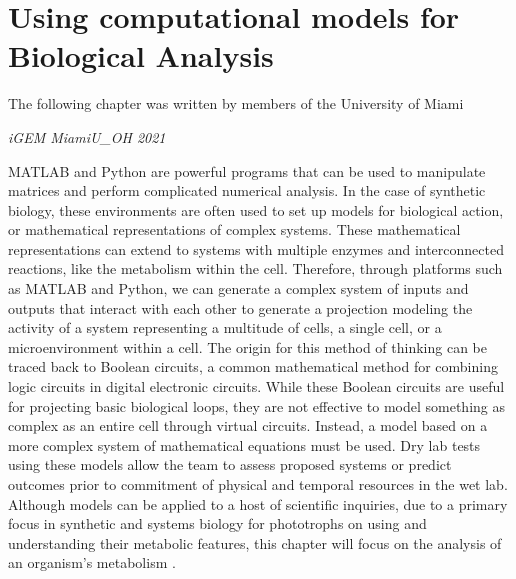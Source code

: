 \section{Using computational models for Biological Analysis}
\epigraph{The following chapter was written by members of the University of Miami }{\textit{iGEM MiamiU\_OH 2021}}
\noindent
MATLAB and Python are powerful programs that can be used to manipulate matrices and perform complicated numerical analysis. In the case of synthetic biology, these environments are often used to set up models for biological action, or mathematical representations of complex systems. These mathematical representations can extend to systems with multiple enzymes and interconnected reactions, like the metabolism within the cell. Therefore, through platforms such as MATLAB and Python, we can generate a complex system of inputs and outputs that interact with each other to generate a projection modeling the activity of a system representing a multitude of cells, a single cell, or a microenvironment within a cell. The origin for this method of thinking can be traced back to Boolean circuits, a common mathematical method for combining logic circuits in digital electronic circuits. While these Boolean circuits are useful for projecting basic biological loops, they are not effective to model something as complex as an entire cell through virtual circuits. Instead, a model based on a more complex system of mathematical equations must be used. Dry lab tests using these models allow the team to assess proposed systems or predict outcomes prior to commitment of physical and temporal resources in the wet lab.\\
Although models can be applied to a host of scientific inquiries, due to a primary focus in synthetic and systems biology for phototrophs on using and understanding their metabolic features, this chapter will focus on the analysis of an organism’s metabolism \parencite{Klemencic2017}.

